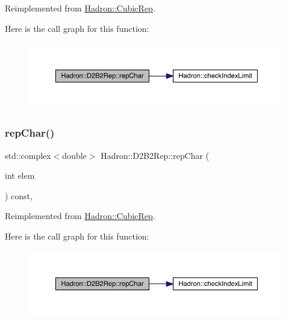Reimplemented from \mbox{\hyperlink{structHadron_1_1CubicRep_af45227106e8e715e84b0af69cd3b36f8}{Hadron\+::\+Cubic\+Rep}}.

Here is the call graph for this function\+:
\nopagebreak
\begin{figure}[H]
\begin{center}
\leavevmode
\includegraphics[width=350pt]{d3/dbb/structHadron_1_1D2B2Rep_ac6671e025a80770e2dc48904f7e78398_cgraph}
\end{center}
\end{figure}
\mbox{\label{structHadron_1_1D2B2Rep_ac6671e025a80770e2dc48904f7e78398}} 
\subsubsection{\texorpdfstring{repChar()}{repChar()}\hspace{0.1cm}{\footnotesize\ttfamily [3/3]}}
{\footnotesize\ttfamily std\+::complex$<$double$>$ Hadron\+::\+D2\+B2\+Rep\+::rep\+Char (\begin{DoxyParamCaption}\item[{int}]{elem }\end{DoxyParamCaption}) const\hspace{0.3cm}{\ttfamily [inline]}, {\ttfamily [virtual]}}



Reimplemented from \mbox{\hyperlink{structHadron_1_1CubicRep_af45227106e8e715e84b0af69cd3b36f8}{Hadron\+::\+Cubic\+Rep}}.

Here is the call graph for this function\+:
\nopagebreak
\begin{figure}[H]
\begin{center}
\leavevmode
\includegraphics[width=350pt]{d3/dbb/structHadron_1_1D2B2Rep_ac6671e025a80770e2dc48904f7e78398_cgraph}
\end{center}
\end{figure}
\mbox{\label{structHadron_1_1D2B2Rep_a0e46bb79c1d9429a207f9f82eef59450}} 
